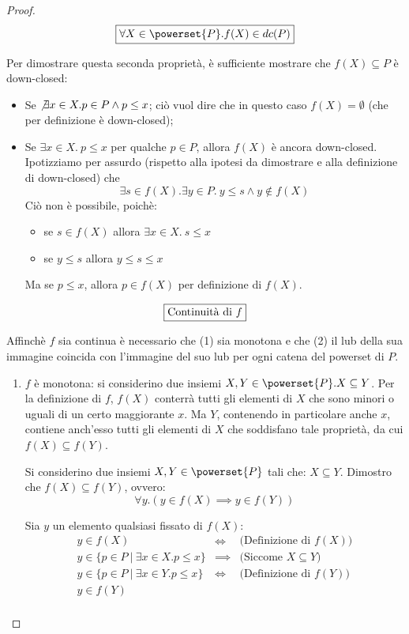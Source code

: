\begin{proof}
$$
\boxer{\forall{X} \in \powerset{P}. f(X) \in dc(P)}
$$

Per dimostrare questa seconda proprietà, è sufficiente mostrare che
$f(X) \subseteq P$ è down-closed:

\begin{itemize}
  \item Se $\not \exists{x}\in X. p\in P \land p \leq x$; ciò vuol dire che in
    questo caso $f(X) = \emptyset$ (che per definizione è down-closed);
  \item Se $\exists{x}\in X.\ p \leq x$ per qualche $p \in P$, allora $f(X)$ è
    ancora down-closed. Ipotizziamo per assurdo (rispetto alla ipotesi da
    dimostrare e alla definizione di down-closed) che
    $$
    \exists{s\in f(X)}.\exists{y}\in P.\ y \leq s \land y \not \in f(X)
    $$
    Ciò non è possibile, poichè:
    \begin{itemize}
      \item se $s \in f(X)$ allora $\exists{x}\in X.\ s \leq x$
      \item se $y \leq s$ allora $y \leq s \leq x$
    \end{itemize}
    Ma se $p \leq x$, allora $p \in f(X)$ per definizione di $f(X)$.
\end{itemize}

$$
\boxer{\text{Continuità di } f}
$$

Affinchè $f$ sia continua è necessario che (1) sia monotona e che (2) il lub
della sua immagine coincida con l'immagine del suo lub per ogni catena del
powerset di $P$.

\begin{enumerate}
  \item $f$ è monotona: si considerino due insiemi
    $X,Y\in \powerset{P}. X \subseteq Y$. Per la definizione di $f$, $f(X)$ conterrà
    tutti gli elementi di $X$ che sono minori o uguali di un certo maggiorante
    $x$.
    Ma $Y$, contenendo in particolare anche $x$, contiene anch'esso tutti gli
    elementi di $X$ che soddisfano tale proprietà, da cui
    $f(X) \subseteq f(Y)$.

    Si considerino due insiemi $X, Y \in \powerset{P}$ tali che:
    $X \subseteq Y$. Dimostro che $f(X) \subseteq f(Y)$, ovvero:
    $$
    \forall y.(y \in f(X) \implies y \in f(Y))
    $$
    
    Sia $y$ un elemento qualsiasi fissato di $f(X)$:
    $$
    \begin{array}{llr}
     y \in f(X) & \iff & \text{(Definizione di $f(X))$}\\
     y \in \{p \in P\ |\ \exists x \in X. p \leq x \} & \implies & \text{(Siccome $X \subseteq Y$) } \\
     y \in \{p \in P\ |\ \exists x \in Y. p \leq x \} & \iff &
     \text{(Definizione di $f(Y)$)} \\
     y \in f(Y) & & \\
    \end{array}
    $$
    

\end{enumerate}
\end{proof}
